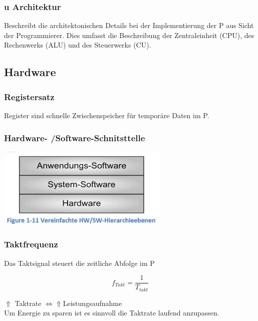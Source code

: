 \subsubsection{u Architektur}
Beschreibt die architektonischen Details bei der Implementierung der \mu P aus Sicht der Programmierer.
Dies umfasst die Beschreibung der Zentraleinheit (CPU), des Rechenwerks (ALU) und des Steuerwerks (CU).


\clearpage
\begin{minipage}{10cm}
\subsection{Hardware}
\subsubsection{Registersatz}
Register sind schnelle Zwischenspeicher für \newline
temporäre Daten im \mu P.
\end{minipage}
\begin{minipage}{0.5\linewidth}
\subsubsection{Hardware- /Software-Schnitsttelle}
\includegraphics{images/HardwareSoftware}
\end{minipage}

\subsubsection{Taktfrequenz}
Das Taktsignal steuert die zeitliche Abfolge im \mu P \newline
\begin{multicols}{2}
        \begin{minipage}{\linewidth}
    \[ f_{Takt}= \frac{1}{T_{takt}} \]
        \end{minipage}
    
    \begin{minipage}{\linewidth}
        $ \Uparrow $ Taktrate $ \Leftrightarrow $$  \Uparrow  $Leistungsaufnahme \\
        Um Energie zu sparen ist es sinnvoll die Taktrate laufend anzupassen.\\
    \end{minipage}
\end{multicols}

